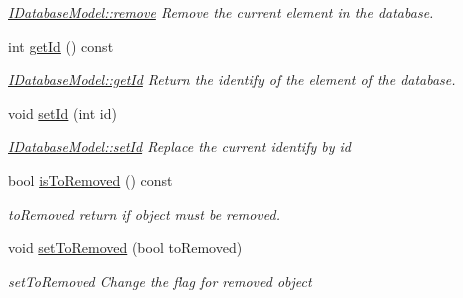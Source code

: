 \begin{DoxyCompactItemize}
\begin{DoxyCompactList}\small\item\em \hyperlink{classModels_1_1IDatabaseModel_a6d8eca5b493b57c21feafae75c783b14}{I\+Database\+Model\+::remove} Remove the current element in the database. \end{DoxyCompactList}\item 
int \hyperlink{classModels_1_1IDatabaseModel_a6a4d1d3c0912c97c61a9d4de7471afee}{get\+Id} () const 
\begin{DoxyCompactList}\small\item\em \hyperlink{classModels_1_1IDatabaseModel_a6a4d1d3c0912c97c61a9d4de7471afee}{I\+Database\+Model\+::get\+Id} Return the identify of the element of the database. \end{DoxyCompactList}\item 
void \hyperlink{classModels_1_1IDatabaseModel_a6bf2ec005b5d931e58ee8125e92d9722}{set\+Id} (int id)
\begin{DoxyCompactList}\small\item\em \hyperlink{classModels_1_1IDatabaseModel_a6bf2ec005b5d931e58ee8125e92d9722}{I\+Database\+Model\+::set\+Id} Replace the current identify by {\itshape id} \end{DoxyCompactList}\item 
bool \hyperlink{classModels_1_1IDatabaseModel_a058e5b85d95e9424245dc37eb122350c}{is\+To\+Removed} () const 
\begin{DoxyCompactList}\small\item\em to\+Removed return if object must be removed. \end{DoxyCompactList}\item 
void \hyperlink{classModels_1_1IDatabaseModel_ac399b44ba1178ef6f54da31203e11d9f}{set\+To\+Removed} (bool to\+Removed)
\begin{DoxyCompactList}\small\item\em set\+To\+Removed Change the flag for removed object \end{DoxyCompactList}\end{DoxyCompactItemize}
